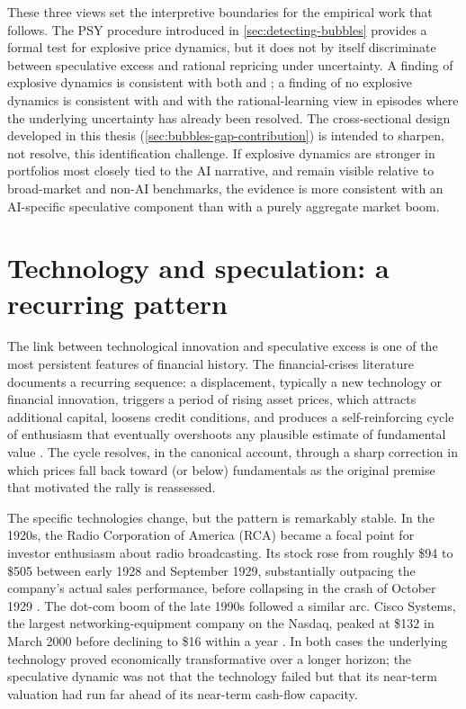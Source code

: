 These three views set the interpretive boundaries for the empirical work that follows. The PSY procedure introduced in \cref{sec:detecting-bubbles} provides a formal test for explosive price dynamics, but it does not by itself discriminate between speculative excess and rational repricing under uncertainty. A finding of explosive dynamics is consistent with both \citet{shiller2000} and \citet{pastorVeronesi2009}; a finding of no explosive dynamics is consistent with \citet{fama1970} and with the rational-learning view in episodes where the underlying uncertainty has already been resolved. The cross-sectional design developed in this thesis (\cref{sec:bubbles-gap-contribution}) is intended to sharpen, not resolve, this identification challenge. If explosive dynamics are stronger in portfolios most closely tied to the AI narrative, and remain visible relative to broad-market and non-AI benchmarks, the evidence is more consistent with an AI-specific speculative component than with a purely aggregate market boom.

\section{Technology and speculation: a recurring pattern}
\label{sec:technology-speculation}

The link between technological innovation and speculative excess is one of the most persistent features of financial history. The financial-crises literature documents a recurring sequence: a displacement, typically a new technology or financial innovation, triggers a period of rising asset prices, which attracts additional capital, loosens credit conditions, and produces a self-reinforcing cycle of enthusiasm that eventually overshoots any plausible estimate of fundamental value \citep{kindlebergerAliber2015}. The cycle resolves, in the canonical account, through a sharp correction in which prices fall back toward (or below) fundamentals as the original premise that motivated the rally is reassessed.

The specific technologies change, but the pattern is remarkably stable. In the 1920s, the Radio Corporation of America (RCA) became a focal point for investor enthusiasm about radio broadcasting. Its stock rose from roughly \$94 to \$505 between early 1928 and September 1929, substantially outpacing the company's actual sales performance, before collapsing in the crash of October 1929 \citep{brunerMiller2019,sirkin1975}. The dot-com boom of the late 1990s followed a similar arc. Cisco Systems, the largest networking-equipment company on the Nasdaq, peaked at \$132 in March 2000 before declining to \$16 within a year \citep{hirschey2001}. In both cases the underlying technology proved economically transformative over a longer horizon; the speculative dynamic was not that the technology failed but that its near-term valuation had run far ahead of its near-term cash-flow capacity.

